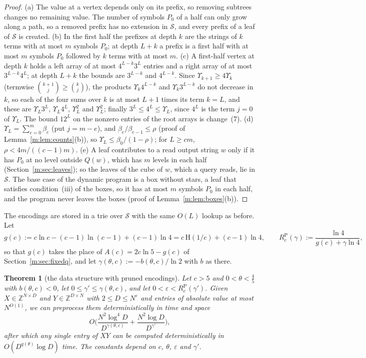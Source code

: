 \documentclass[11pt]{article}
\newtheorem{theorem}{Theorem}[section]
\theoremstyle{definition}
\theoremstyle{remark}
\newcommand{\Z}{\mathbb{Z}}
\newcommand{\Hh}{\mathrm{H}}
\begin{document}
\begin{proof}
(a) The value at a vertex depends only on its prefix, so removing subtrees changes no remaining value. The number of symbols $P_0$ of a half can only grow along a path, so a removed prefix has no extension in $\mathcal S$, and every prefix of a leaf of $\mathcal S$ is created. (b) In the first half the prefixes at depth $k$ are the strings of $k$ terms with at most $m$ symbols $P_0$; at depth $L+k$ a prefix is a first half with at most $m$ symbols $P_0$ followed by $k$ terms with at most $m$. (c) A first-half vertex at depth $k$ holds a left array of at most $4^{L-k}3^L$ entries and a right array of at most $3^{L-k}4^L$; at depth $L+k$ the bounds are $3^{L-k}$ and $4^{L-k}$. Since $\Upsilon_{k+1}\ge4\Upsilon_k$ (termwise $\binom{k+1}j\ge\binom kj$), the products $\Upsilon_k4^{L-k}$ and $\Upsilon_k3^{L-k}$ do not decrease in $k$, so each of the four sums over $k$ is at most $L+1$ times its term $k=L$, and these are $\Upsilon_L3^L$, $\Upsilon_L4^L$, $\Upsilon_L^2$ and $\Upsilon_L^2$; finally $3^L\le4^L\le\Upsilon_L$, since $4^L$ is the term $j=0$ of $\Upsilon_L$. The bound $12^L$ on the nonzero entries of the root arrays is change~(7). (d) $\Upsilon_L=\sum_{e=0}^m\beta_e$ (put $j=m-e$), and $\beta_e/\beta_{e-1}\le\rho$ (proof of Lemma~\ref{m:lem:counts}(b)), so $\Upsilon_L\le\beta_0/(1-\rho)$; for $L\ge cm$, $\rho<4m/((c-1)m)$. (e) A leaf contributes to a read output string $w$ only if it has $P_0$ at no level outside $Q(w)$, which has $m$ levels in each half (Section~\ref{m:sec:leaves}); so the leaves of the cube of $w$, which a query reads, lie in $\mathcal S$. The base case of the dynamic program is a box without stars, a leaf that satisfies condition~(iii) of the boxes, so it has at most $m$ symbols $P_0$ in each half, and the program never leaves the boxes (proof of Lemma~\ref{m:lem:boxes}(b)).
\end{proof}

The encodings are stored in a trie over $\mathcal S$ with the same $O(L)$ lookup as before. Let
\[
g(c):=c\ln c-(c-1)\ln(c-1)+(c-1)\ln4=c\,\Hh(1/c)+(c-1)\ln4,\qquad R^{\mathrm P}_c(\gamma):=\frac{\ln4}{g(c)+\gamma\ln4},
\]
so that $g(c)$ takes the place of $A(c)=2c\ln5-g(c)$ of Section~\ref{m:sec:fixedq}, and let $\gamma(\theta,c):=-b(\theta,c)/\ln2$ with $b$ as there.

\begin{theorem}[the data structure with pruned encodings]\label{m:thm:pruned}
Let $c>5$ and $0<\theta<\frac45$ with $b(\theta,c)<0$, let $0\le\gamma'\le\gamma(\theta,c)$, and let $0<\varepsilon<R^{\mathrm P}_c(\gamma')$. Given $X\in\Z^{N\times D}$ and $Y\in\Z^{D\times N}$ with $2\le D\le N^\varepsilon$ and entries of absolute value at most $N^{O(1)}$, we can preprocess them deterministically in time and space
\[
O\Big(\frac{N^2\log^4\!D}{D^{\gamma(\theta,c)}}+\frac{N^2\log D}{D^{\gamma'}}\Big),
\]
after which any single entry of $XY$ can be computed deterministically in $O(D^{q(\theta)}\log D)$ time. The constants depend on $c$, $\theta$, $\varepsilon$ and $\gamma'$.
\end{theorem}
\end{document}
